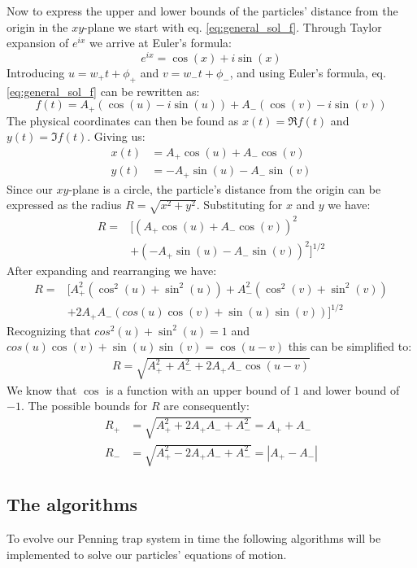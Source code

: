 \documentclass[english,notitlepage,reprint,nofootinbib]{revtex4-1}  %
\begin{document}
Now to express the upper and lower bounds of the particles' distance from the origin in the $xy$-plane 
we start with eq. \ref*{eq:general_sol_f}. Through Taylor expansion of $e^{ix}$ we arrive at Euler's formula:
\begin{equation*}
    e^{ix} = \cos(x) + i \sin(x)
\end{equation*} 
Introducing $u =  w_+ t + \phi_+$ and $v = w_- t + \phi_-$, and using 
Euler's formula, eq. \ref*{eq:general_sol_f} can be rewritten as:
\begin{equation*}
    f(t) = A_+\left(\cos(u) - i \sin(u) \right) + A_-\left(\cos(v) - i \sin(v) \right)
\end{equation*}
The physical coordinates can then be found as $x(t) = \Re f(t)$ and  $y(t) = \Im f(t)$. Giving us:
\begin{align*}
    x(t) &= A_+ \cos(u) + A_- \cos(v) \\
    y(t) &= -A_+ \sin(u) - A_- \sin(v)
\end{align*}
Since our $xy$-plane is a circle, the particle's distance from the origin can be expressed as the radius $R = \sqrt{x^2 + y^2}$. 
Substituting for $x$ and $y$ we have:
\begin{align*}
    R = &[ (A_+ \cos(u) + A_- \cos(v))^2 \\ &+ (-A_+ \sin(u) - A_- \sin(v))^2 ]^{1/2}
\end{align*}
After expanding and rearranging we have:
\begin{align*}
   R = &[A_+^2(\cos^2(u) + \sin^2(u)) + A_-^2(\cos^2(v) + \sin^2(v)) \\ &+ 2 A_+ A_- (cos(u)\cos(v) + \sin(u)\sin(v))]^{1/2}
\end{align*}
Recognizing that $cos^2(u) + \sin^2(u) = 1$ and $cos(u)\cos(v) + \sin(u)\sin(v) = \cos(u-v)$ this can be simplified to:
\begin{align*}
    R = \sqrt{A_+^2 + A_-^2 + 2 A_+ A_- \cos(u-v)}
\end{align*}
We know that $\cos$ is a function with an upper bound of $1$ and lower bound of $-1$. 
The possible bounds for $R$ are consequently:
\begin{align*}
    R_+ &= \sqrt{A_+^2 +2A_+ A_- + A_-^2} = A_+ + A_- \\
    R_- &= \sqrt{A_+^2 -2A_+ A_- + A_-^2} = |A_+ - A_-|
\end{align*}
\subsection*{The algorithms}
To evolve our Penning trap system in time the following algorithms will be implemented to solve our particles' equations of motion. 
\end{document}
